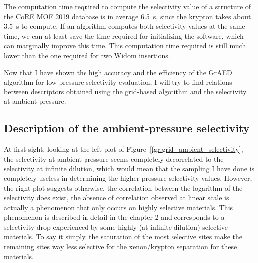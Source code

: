 \documentclass[main]{subfiles}
\begin{document}
The computation time required to compute the selectivity value of a structure of the CoRE MOF 2019 database is in average \SI{6.5}{\second}, since the krypton takes about \SI{3.5}{\second} to compute. If an algorithm computes both selectivity values at the same time, we can at least save the time required for initializing the software, which can marginally improve this time. This computation time required is still much lower than the one required for two Widom insertions.

Now that I have shown the high accuracy and the efficiency of the GrAED algorithm for low-pressure selectivity evaluation, I will try to find relations between descriptors obtained using the grid-based algorithm and the selectivity at ambient pressure.

\subsection{Description of the ambient-pressure selectivity}

At first sight, looking at the left plot of Figure~\ref{fgr:grid_ambient_selectivity}, the selectivity at ambient pressure seems completely decorrelated to the selectivity at infinite dilution, which would mean that the sampling I have done is completely useless in determining the higher pressure selectivity values. However, the right plot suggests otherwise, the correlation between the logarithm of the selectivity does exist, the absence of correlation observed at linear scale is actually a phenomenon that only occurs on highly selective materials. This phenomenon is described in detail in the chapter 2 and corresponds to a selectivity drop experienced by some highly (at infinite dilution) selective materials. To say it simply, the saturation of the most selective sites make the remaining sites way less selective for the xenon/krypton separation for these materials.
\end{document}
